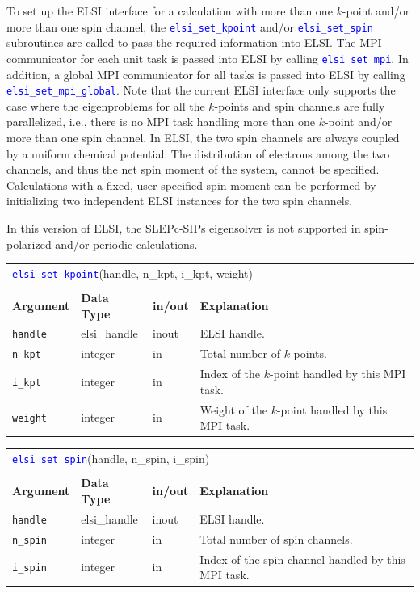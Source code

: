 \documentclass{report}
\newcommand{\api}[1]{\textcolor{blue}{\texttt{#1}}}
\begin{document}
To set up the ELSI interface for a calculation with more than one $k$-point and/or more than one spin channel, the \api{elsi\_set\_kpoint} and/or \api{elsi\_set\_spin} subroutines are called to pass the required information into ELSI. The MPI communicator for each unit task is passed into ELSI by calling \api{elsi\_set\_mpi}. In addition, a global MPI communicator for all tasks is passed into ELSI by calling \api{elsi\_set\_mpi\_global}. Note that the current ELSI interface only supports the case where the eigenproblems for all the $k$-points and spin channels are fully parallelized, i.e., there is no MPI task handling more than one $k$-point and/or more than one spin channel. In ELSI, the two spin channels are always coupled by a uniform chemical potential. The distribution of electrons among the two channels, and thus the net spin moment of the system, cannot be specified. Calculations with a fixed, user-specified spin moment can be performed by initializing two independent ELSI instances for the two spin channels.

In this version of ELSI, the SLEPc-SIPs eigensolver is not supported in spin-polarized and/or periodic calculations.

\begin{tabular}[]{|p{20mm}|p{20mm}|p{10mm}|p{112mm}|}
\multicolumn{4}{l}{\api{elsi\_set\_kpoint}(handle, n\_kpt, i\_kpt, weight)}\\
\multicolumn{4}{l}{}\\
\hline
\multicolumn{1}{|l|}{\textbf{Argument}} & \multicolumn{1}{l|}{\textbf{Data Type}} & \multicolumn{1}{l|}{\textbf{in/out}} & \multicolumn{1}{l|}{\textbf{Explanation}}\\
\hline
\texttt{handle} & elsi\_handle & inout & ELSI handle.\\
\hline
\texttt{n\_kpt} & integer      & in    & Total number of $k$-points.\\
\hline
\texttt{i\_kpt} & integer      & in    & Index of the $k$-point handled by this MPI task.\\
\hline
\texttt{weight} & integer      & in    & Weight of the $k$-point handled by this MPI task.\\
\hline
\end{tabular}

\begin{tabular}[]{|p{20mm}|p{20mm}|p{10mm}|p{112mm}|}
\multicolumn{4}{l}{\api{elsi\_set\_spin}(handle, n\_spin, i\_spin)}\\
\multicolumn{4}{l}{}\\
\hline
\multicolumn{1}{|l|}{\textbf{Argument}} & \multicolumn{1}{l|}{\textbf{Data Type}} & \multicolumn{1}{l|}{\textbf{in/out}} & \multicolumn{1}{l|}{\textbf{Explanation}}\\
\hline
\texttt{handle}  & elsi\_handle & inout & ELSI handle.\\
\hline
\texttt{n\_spin} & integer      & in    & Total number of spin channels.\\
\hline
\texttt{i\_spin} & integer      & in    & Index of the spin channel handled by this MPI task.\\
\hline
\end{tabular}
\end{document}
